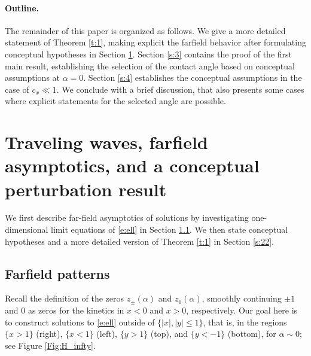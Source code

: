 \documentclass[10pt]{article}
\renewcommand{\leq}{\leqslant}
\begin{document}
\paragraph{Outline.} The remainder of this paper is organized as follows. We give a more detailed statement of Theorem \ref{t:1}, making explicit the farfield behavior after formulating conceptual hypotheses in Section \ref{s:2}. Section \ref{s:3} contains the proof of the first main result, establishing the selection of the contact angle based on conceptual assumptions at $\alpha=0$. Section \ref{s:4} establishes the conceptual assumptions in the case of $c_x\ll1$. We conclude with a brief discussion, that also presents some cases where explicit statements for the selected angle are possible. 



\section{Traveling waves, farfield asymptotics, and a conceptual perturbation result}\label{s:2}
We first describe far-field asymptotics of solutions by investigating one-dimensional limit equations of \eqref{e:ell} in Section \ref{s:21}. We then state conceptual hypotheses and a more detailed version of Theorem \ref{t:1} in Section \ref{s:22}.



\subsection{Farfield patterns}\label{s:21}
Recall the definition of the zeros $z_\pm(\alpha)$ and $z_0(\alpha)$, smoothly continuing $\pm1$ and $0$ as zeros for the kinetics in $x<0$ and $x>0$, respectively. Our goal here is to construct solutions to \eqref{e:ell} outside of $\{|x|,|y|\leq 1\}$, that is, in the regions $\{x>1\}$ (right), $\{x<1\}$ (left), $\{y>1\}$ (top), and $\{y<-1\}$ (bottom), for $\alpha\sim 0$; see Figure \ref{Fig:H_infty}.
\end{document}
